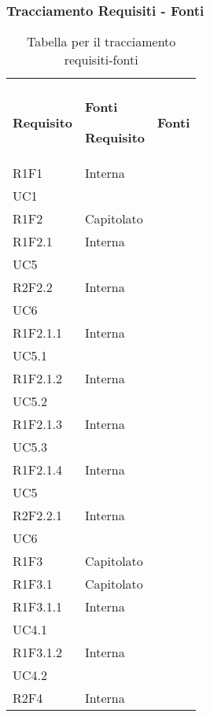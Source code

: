 \newpage
\subsubsection{Tracciamento Requisiti - Fonti}

\renewcommand{\arraystretch}{2.2}

\begin{longtable}{|C{6.5cm}|C{6.5cm}|}
	\caption{Tabella per il tracciamento requisiti-fonti}\\
	\textbf{Requisito} & \textbf{Fonti}
	\endfirsthead

	\hline

	\textbf{Requisito} & \textbf{Fonti}
	\tabularnewline
	\endhead

	R1F1 & \centering Interna \\ UC1 \tabularnewline

	R1F2 & Capitolato \\

	R1F2.1 & \centering Interna \\ UC5 \tabularnewline

	R2F2.2 & \centering Interna \\ UC6 \tabularnewline

	R1F2.1.1 & \centering Interna \\ UC5.1 \tabularnewline

	R1F2.1.2 &   \centering Interna \\ UC5.2 \tabularnewline

	R1F2.1.3 &  \centering Interna \\ UC5.3 \tabularnewline

	R1F2.1.4 &  \centering Interna \\ UC5 \tabularnewline

	R2F2.2.1 &  \centering Interna \\ UC6 \tabularnewline

	R1F3 & Capitolato \\

	R1F3.1 & Capitolato \\

	R1F3.1.1 &  \centering Interna \\ UC4.1 \tabularnewline

	R1F3.1.2 &  \centering Interna \\ UC4.2 \tabularnewline

	R2F4 &  Interna \\


\end{longtable}
